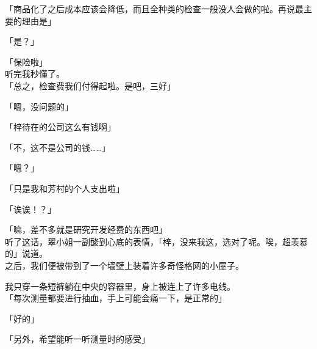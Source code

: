 「商品化了之后成本应该会降低，而且全种类的检查一般没人会做的啦。再说最主要的理由是」

「是？」

「保险啦」\\

听完我秒懂了。\\

「总之，检查费我们付得起啦。是吧，三好」

「嗯，没问题的」

「梓待在的公司这么有钱啊」

「不，这不是公司的钱……」

「嗯？」

「只是我和芳村的个人支出啦」

「诶诶！？」

「嘛，差不多就是研究开发经费的东西吧」\\

听了这话，翠小姐一副酸到心底的表情，「梓，没来我这，选对了呢。唉，超羡慕的」说道。\\

之后，我们便被带到了一个墙壁上装着许多奇怪格网的小屋子。

我只穿一条短裤躺在中央的容器里，身上被连上了许多电线。\\

「每次测量都要进行抽血，手上可能会痛一下，是正常的」

「好的」

「另外，希望能听一听测量时的感受」

